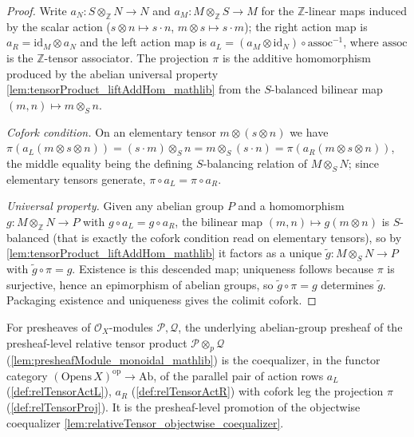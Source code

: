 \begin{proof}
  \leanok
  Write \(a_N : S \otimes_{\mathbb{Z}} N \to N\) and
  \(a_M : M \otimes_{\mathbb{Z}} S \to M\) for the \(\mathbb{Z}\)-linear maps
  induced by the scalar action (\(s \otimes n \mapsto s \cdot n\),
  \(m \otimes s \mapsto s \cdot m\)); the right action map is
  \(a_R = \mathrm{id}_M \otimes a_N\) and the left action map is
  \(a_L = (a_M \otimes \mathrm{id}_N) \circ \mathrm{assoc}^{-1}\), where
  \(\mathrm{assoc}\) is the \(\mathbb{Z}\)-tensor associator. The projection
  \(\pi\) is the additive homomorphism produced by the abelian universal property
  \cref{lem:tensorProduct_liftAddHom_mathlib} from the \(S\)-balanced bilinear map
  \((m, n) \mapsto m \otimes_S n\).

  \emph{Cofork condition.} On an elementary tensor
  \(m \otimes (s \otimes n)\) we have
  \(\pi(a_L(m \otimes s \otimes n)) = (s \cdot m) \otimes_S n
  = m \otimes_S (s \cdot n) = \pi(a_R(m \otimes s \otimes n))\), the middle
  equality being the defining \(S\)-balancing relation of \(M \otimes_S N\); since
  elementary tensors generate, \(\pi \circ a_L = \pi \circ a_R\).

  \emph{Universal property.} Given any abelian group \(P\) and a homomorphism
  \(g : M \otimes_{\mathbb{Z}} N \to P\) with \(g \circ a_L = g \circ a_R\), the
  bilinear map \((m, n) \mapsto g(m \otimes n)\) is \(S\)-balanced (that is exactly
  the cofork condition read on elementary tensors), so by
  \cref{lem:tensorProduct_liftAddHom_mathlib} it factors as a unique
  \(\widetilde{g} : M \otimes_S N \to P\) with \(\widetilde{g} \circ \pi = g\).
  Existence is this descended map; uniqueness follows because \(\pi\) is
  surjective, hence an epimorphism of abelian groups, so \(\widetilde{g} \circ \pi
  = g\) determines \(\widetilde{g}\). Packaging existence and uniqueness gives the
  colimit cofork.

\end{proof}


\begin{lemma}
  \label{lem:relativeTensor_as_coequalizer}
  For presheaves of \(\mathcal{O}_X\)-modules \(\mathcal{P}, \mathcal{Q}\), the
  underlying abelian-group presheaf of the presheaf-level relative tensor product
  \(\mathcal{P} \otimes_p \mathcal{Q}\) (\cref{lem:presheafModule_monoidal_mathlib})
  is the coequalizer, in the functor category
  \((\mathrm{Opens}\,X)^{\mathrm{op}} \to \mathrm{Ab}\), of the parallel pair of
  action rows \(a_L\) (\cref{def:relTensorActL}), \(a_R\)
  (\cref{def:relTensorActR}) with cofork leg the projection \(\pi\)
  (\cref{def:relTensorProj}). It is the presheaf-level promotion of the objectwise
  coequalizer \cref{lem:relativeTensor_objectwise_coequalizer}.
\end{lemma}

